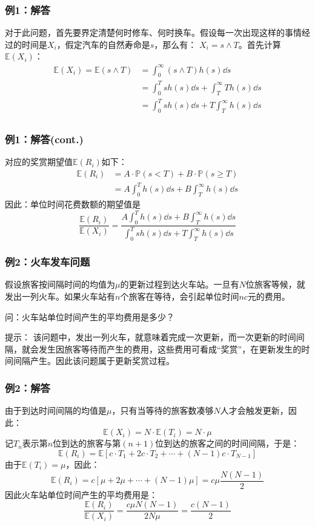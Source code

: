 \documentclass[t]{beamer}
\renewcommand{\Pr}{\mathbb{P}}
\newcommand{\E}{\mathbb{E}}
\begin{document}
\begin{frame}
  \frametitle{例1：解答}
  对于此问题，首先要界定清楚何时修车、何时换车。假设每一次出现这样的事情经过的时间是$X_i$，假定汽车的自然寿命是$s$，那么有：
  $X_i=s\wedge T$。首先计算$\E(X_i)$：
\[\begin{split}
  \E(X_i)=\E(s\wedge T) &=\int^{\infty}_0(s\wedge T)h(s)\dd s\\
  &=\int^T_0 s h(s)\dd s +\int^{\infty}_T T h(s)\dd s\\
  &=\int^T_0 s h(s)\dd s +T\int^{\infty}_T  h(s)\dd s\\
\end{split}\]
\end{frame}


\begin{frame}
  \frametitle{例1：解答(cont.)}
对应的奖赏期望值$\E(R_i)$如下：
\[\begin{split}
  \E(R_i) &= A\cdot \Pr(s<T)+B\cdot \Pr(s\ge T)\\
  &=A\int^T_0 h(s)\dd s+B\int^{\infty}_T h(s)\dd s
\end{split}\]
因此：单位时间花费数额的期望值是
\[\frac{\E(R_i)}{\E(X_i)}=\frac{\displaystyle  A\int^T_0 h(s)\dd s+B\int^{\infty}_T h(s)\dd s}{\displaystyle  \int^T_0 s h(s)\dd s +T\int^{\infty}_T  h(s)\dd s}\]
  

\end{frame}


\begin{frame}
  \frametitle{例2：火车发车问题}
  假设旅客按间隔时间的均值为$\mu$的更新过程到达火车站。一旦有$N$位旅客等候，就发出一列火车。如果火车站有$n$个旅客在等待，会引起单位时间$nc$元的费用。

问：火车站单位时间产生的平均费用是多少？

\begin{block}{提示：}
  该问题中，发出一列火车，就意味着完成一次更新，而一次更新的时间间隔，就会发生因旅客等待而产生的费用，这些费用可看成“奖赏”，在更新发生的时间间隔产生。因此该问题属于更新奖赏过程。
\end{block}
\end{frame}


\begin{frame}
  \frametitle{例2：解答}
  由于到达时间间隔的均值是$\mu$，只有当等待的旅客数凑够$N$人才会触发更新，因此：
  \[\E(X_i)= N\cdot\E(T_i) =  N\cdot \mu\]
  记$T_n$表示第$n$位到达的旅客与第$(n+1)$位到达的旅客之间的时间间隔，于是：
  \[\E(R_i)=\E[c\cdot T_1+2c\cdot T_2+\cdots +(N-1)c\cdot T_{N-1}]\]
  由于$\E(T_i)=\mu$，因此：
  \[\E(R_i)=c[\mu+2\mu+\cdots+(N-1)\mu]=c\mu\frac{N(N-1)}{2}\]
  因此火车站单位时间产生的平均费用是：
  \[\frac{\E(R_i)}{\E(X_i)}=\frac{c\mu N(N-1)}{2N\mu}=\frac{c(N-1)}{2}\]
\end{frame}
\end{document}
